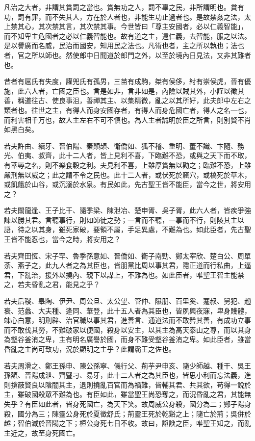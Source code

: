
\begin{pinyinscope}
凡治之大者，非謂其賞罰之當也。賞無功之人，罰不辜之民，非所謂明也。賞有功，罰有罪，而不失其人，方在於人者也，非能生功止過者也。是故禁姦之法，太上禁其心，其次禁其言，其次禁其事。今世皆曰「尊主安國者，必以仁義智能」，而不知卑主危國者之必以仁義智能也。故有道之主，遠仁義，去智能，服之以法。是以譽廣而名威，民治而國安，知用民之法也。凡術也者，主之所以執也；法也者，官之所以師也。然使郎中日聞道於郎門之外，以至於境內日見法，又非其難者也。

昔者有扈氏有失度，讙兜氏有孤男，三苗有成駒，桀有侯侈，紂有崇侯虎，晉有優施，此六人者，亡國之臣也。言是如非，言非如是，內險以賊其外，小謹以徵其善，稱道往古、使良事沮，善禪其主、以集精微，亂之以其所好，此夫郎中左右之類者也。往世之主，有得人而身安國存者，有得人而身危國亡者，得人之名一也，而利害相千万也，故人主左右不可不慎也。為人主者誠明於臣之所言，則別賢不肖如黑白矣。

若夫許由、續牙、晉伯陽、秦顛頡、衛僑如、狐不稽、重明、董不識、卞隨、務光、伯夷、叔齊，此十二人者，皆上見利不喜，下臨難不恐，或與之天下而不取，有萃辱之名，則不樂食穀之利。夫見利不喜，上雖厚賞無以勸之；臨難不恐，上雖嚴刑無以威之；此之謂不令之民也。此十二人者，或伏死於窟穴，或槁死於草木，或飢餓於山谷，或沉溺於水泉。有民如此，先古聖王皆不能臣，當今之世，將安用之？

若夫關龍逢、王子比干、隨季梁、陳泄冶、楚申胥、吳子胥，此六人者，皆疾爭強諫以勝其君。言聽事行，則如師徒之勢；一言而不聽，一事而不行，則陵其主以語，待之以其身，雖死家破，要領不屬，手足異處，不難為也。如此臣者，先古聖王皆不能忍也，當今之時，將安用之？

若夫齊田恆、宋子罕、魯季孫意如、晉僑如、衛子南勁、鄭太宰欣、楚白公、周單荼、燕子之，此九人者之為其臣也，皆朋黨比周以事其君，隱正道而行私曲，上逼君，下亂治，援外以撓內、親下以謀上，不難為也。如此臣者，唯聖王智主能禁之，若夫昏亂之君，能見之乎？

若夫后稷、皋陶、伊尹、周公旦、太公望、管仲、隰朋、百里奚、蹇叔、舅犯、趙衰、范蠡、大夫種、逢同、華登，此十五人者為其臣也，皆夙興夜寐，卑身賤體，竦心白意，明刑辟、治官職以事其君，進善言、通道法而不敢矜其善，有成功立事而不敢伐其勞，不難破家以便國，殺身以安主，以其主為高天泰山之尊，而以其身為壑谷釜洧之卑，主有明名廣譽於國，而身不難受壑谷釜洧之卑。如此臣者，雖當昏亂之主尚可致功，況於顯明之主乎？此謂霸王之佐也。

若夫周滑之、鄭王孫申、陳公孫寧、儀行父、荊芋尹申亥、隨少師越、種干、吳王孫額、晉陽成泄、齊豎刁、易牙，此十二人者之為其臣也，皆思小利而忘法義，進則揜蔽賢良以陰闇其主，退則撓亂百官而為禍難，皆輔其君、共其欲，苟得一說於主，雖破國殺眾不難為也。有臣如此，雖當聖王尚恐奪之，而況昏亂之君，其能無失乎？有臣如此者，皆身死國亡，為天下笑。故周威公身殺，國分為二；鄭子陽身殺，國分為三；陳靈公身死於夏徵舒氏；荊靈王死於乾谿之上；隨亡於荊；吳併於越；智伯滅於晉陽之下；桓公身死七日不收。故曰，諂諛之臣，唯聖王知之，而亂主近之，故至身死國亡。


\end{pinyinscope}
